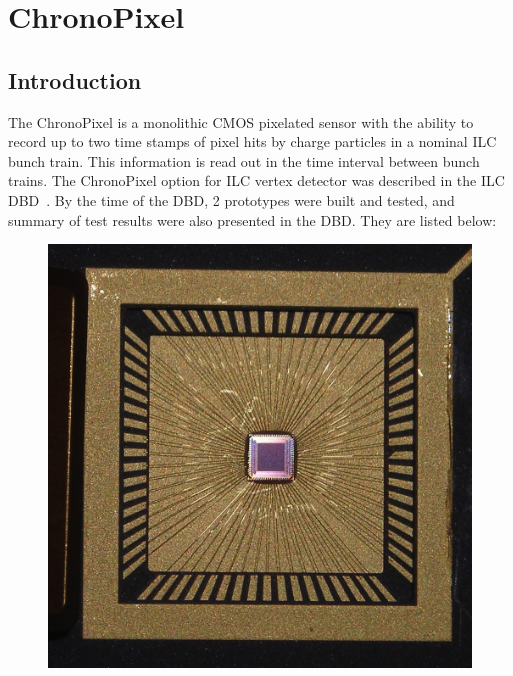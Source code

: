 \section{ChronoPixel}

\subsection{Introduction}
The ChronoPixel is a monolithic CMOS pixelated sensor with the ability to record up to two time stamps of pixel hits by charge particles in a nominal ILC bunch train. This information is read out in the time interval between bunch trains. The ChronoPixel option for ILC vertex detector was described in the ILC DBD~\cite{2011arXiv1109.2811B}. By the time of the DBD, 2 prototypes were built and tested, and summary of test results were also presented in the DBD. They are listed below:
\begin{figure}
    \includegraphics[width=.5\linewidth]{VertexDetector/Chronopix/Chronopix_image}
\end{figure}
